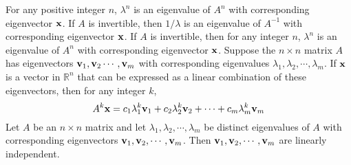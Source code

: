 \documentclass{article}
\begin{document}
\begin{outline}
                \2 For any positive integer $n$, \(\lambda ^n\) is an eigenvalue of \(A^n\) with corresponding eigenvector \(\vb x\). 
                \2 If $A$ is invertible, then \(1/\lambda\) is an eigenvalue of \(A^{-1}\) with corresponding eigenvector \(\vb x\). 
                \2 If \(A\) is invertible, then for any integer \(n\), \(\lambda^n\) is an eigenvalue of \(A^n\) with corresponding eigenvector \(\vb x\). 
            \1 Suppose the \(n\times n\) matrix $A$ has eigenvectors \(\vb v_1,\vb v_2\cdots,\vb v_m\) with corresponding eigenvalues \(\lambda_1,\lambda_2,\cdots,\lambda_m\). If \(\vb x\) is a vector in \(\mathbb R^n\) that can be expressed as a linear combination of these eigenvectors, then for any integer $k$, \[A^k\vb x=c_1\lambda_1^k\vb v_1+c_2\lambda_2^k\vb v_2+\cdots+c_m\lambda_m^k\vb v_m\]
            \1 Let $A$ be an \(n\times n\) matrix and let \(\lambda_1,\lambda_2,\cdots,\lambda_m\) be distinct eigenvalues of $A$ with corresponding eigenvectors \(\vb v_1,\vb v_2,\cdots,\vb v_m\). Then \(\vb v_1,\vb v_2,\cdots,\vb v_m\) are linearly independent. 

        \end{outline}
\end{document}
